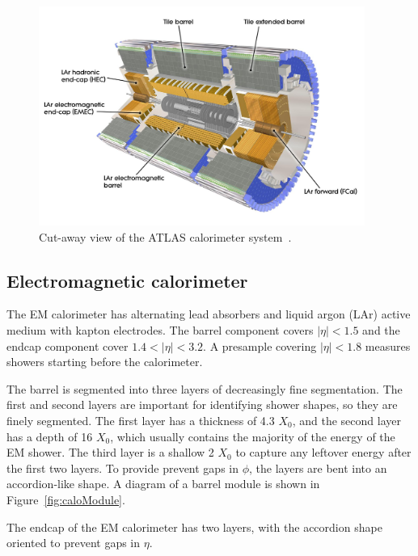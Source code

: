 \begin{figure}[tp]
  \centering
  \includegraphics[width=0.95\textwidth]{fig/atlas/combinedCalo}
  \caption{Cut-away view of the ATLAS calorimeter system~\cite{cern-jinst-atlas}.}
  \label{fig:calo}
\end{figure}
\subsection{Electromagnetic calorimeter}
The EM calorimeter has alternating lead absorbers and liquid argon (LAr) active medium with kapton electrodes. The barrel component covers $|\eta| < 1.5$ and the endcap component cover $1.4 < |\eta| < 3.2$. A presample covering $|\eta| < 1.8$ measures showers starting before the calorimeter. 

The barrel is segmented into three layers of decreasingly fine segmentation. The first and second layers are important for identifying shower shapes, so they are finely segmented. The first layer has a thickness of 4.3 $X_0$, and the second layer has a depth of 16 $X_0$, which usually contains the majority of the energy of the EM shower. The third layer is a shallow 2 $X_0$ to capture any leftover energy after the first two layers. To provide prevent gaps in $\phi$, the layers are bent into an accordion-like shape. A diagram of a barrel module is shown in Figure~\ref{fig:caloModule}. 

The endcap of the EM calorimeter has two layers, with the accordion shape oriented to prevent gaps in $\eta$.




